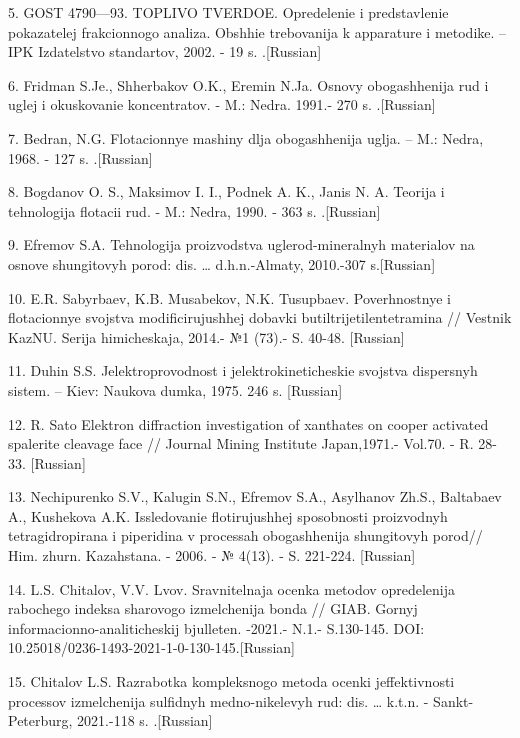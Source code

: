 5. GOST 4790---93. TOPLIVO TVERDOE. Opredelenie i predstavlenie
pokazatelej frakcionnogo analiza. Obshhie trebovanija k apparature i
metodike. -- IPK Izdatel\textquotesingle stvo standartov, 2002. - 19 s.
.{[}Russian{]}

6. Fridman S.Je., Shherbakov O.K., Eremin N.Ja. Osnovy obogashhenija rud
i uglej i okuskovanie koncentratov. - M.: Nedra. 1991.- 270 s.
.{[}Russian{]}

7. Bedran\textquotesingle, N.G. Flotacionnye mashiny dlja obogashhenija
uglja. -- M.: Nedra, 1968. - 127 s. .{[}Russian{]}

8. Bogdanov O. S., Maksimov I. I., Podnek A. K., Janis N. A. Teorija i
tehnologija flotacii rud. - M.: Nedra, 1990. - 363 s. .{[}Russian{]}

9. Efremov S.A. Tehnologija proizvodstva
uglerod-mineral\textquotesingle nyh materialov na osnove shungitovyh
porod: dis. \ldots{} d.h.n.-Almaty, 2010.-307 s.{[}Russian{]}

10. E.R. Sabyrbaev, K.B. Musabekov, N.K. Tusupbaev. Poverhnostnye i
flotacionnye svojstva modificirujushhej dobavki butiltrijetilentetramina
// Vestnik KazNU. Serija himicheskaja, 2014.- №1 (73).- S. 40-48.
{[}Russian{]}

11. Duhin S.S. Jelektroprovodnost\textquotesingle{} i
jelektrokineticheskie svojstva dispersnyh sistem. -- Kiev: Naukova
dumka, 1975. 246 s. {[}Russian{]}

12. R. Sato Elektron diffraction investigation of xanthates on cooper
activated spalerite cleavage face // Journal Mining Institute
Japan,1971.- Vol.70. - R. 28-33. {[}Russian{]}

13. Nechipurenko S.V., Kalugin S.N., Efremov S.A., Asylhanov Zh.S.,
Baltabaev A., Kushekova A.K. Issledovanie flotirujushhej sposobnosti
proizvodnyh tetragidropirana i piperidina v processah obogashhenija
shungitovyh porod// Him. zhurn. Kazahstana. - 2006. - № 4(13). - S.
221-224. {[}Russian{]}

14. L.S. Chitalov, V.V. L\textquotesingle vov.
Sravnitel\textquotesingle naja ocenka metodov opredelenija rabochego
indeksa sharovogo izmel\textquotesingle chenija bonda // GIAB. Gornyj
informacionno-analiticheskij bjulleten\textquotesingle. -2021.- N.1.-
S.130-145. DOI: 10.25018/0236-1493-2021-1-0-130-145.{[}Russian{]}

15. Chitalov L.S. Razrabotka kompleksnogo metoda ocenki jeffektivnosti
processov izmel\textquotesingle chenija sul\textquotesingle fidnyh
medno-nikelevyh rud: dis. \ldots{} k.t.n. - Sankt-Peterburg, 2021.-118
s. .{[}Russian{]}


